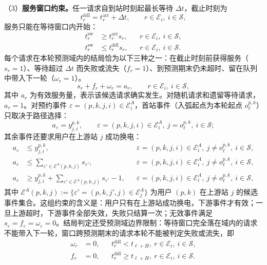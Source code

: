 \documentclass[12pt,a4paper,UTF8]{ctexart}
\begin{document}
（3）\textbf{服务窗口约束。}任一请求自到站时刻起最长等待 $\Delta t$，截止时刻为
\begin{equation}
t_r^{\mathrm{ddl}}
=
t_r^{\mathrm{arr}}+\Delta t,
\qquad
r\in\mathcal E_i,\ i\in\mathcal S,
\label{eq:waiting_deadline}
\end{equation}
服务只能在等待窗口内开始：
\begin{subequations}
\label{eq:service_window}
\begin{align}
t_r^{\mathrm{sw}}&\ge t_r^{\mathrm{arr}}s_r,
&&r\in\mathcal E_i,\ i\in\mathcal S,\\
t_r^{\mathrm{sw}}&\le t_r^{\mathrm{ddl}}s_r,
&&r\in\mathcal E_i,\ i\in\mathcal S.
\end{align}
\end{subequations}
每个请求在本轮预测域内的结局恰为以下三种之一：在截止时刻前获得服务（$s_r=1$）、等待超过 $\Delta t$ 而失败或流失（$f_r=1$）、到预测期末仍未超时、留在队列中带入下一轮（$\omega_r=1$）。
\begin{equation}
s_r+f_r+\omega_r=a_r,
\qquad
r\in\mathcal E_i,\ i\in\mathcal S,
\label{eq:reservation_conservation_main}
\end{equation}
其中 $a_r$ 为有效服务量，表示该候选请求确实发生。对随机请求和遗留等待请求，$a_r=1$。对预约事件 $\varepsilon=(p,k,j,i)\in\mathcal E_i^A$，首站事件（入弧起点为本轮起点 $o_\ell^{p,k}$）只取决于路径选择：
\begin{equation}
a_\varepsilon=y_{j,i}^{p,k},
\qquad
\varepsilon=(p,k,j,i)\in\mathcal E_i^A,\ j=o_\ell^{p,k},\ i\in\mathcal S;
\label{eq:first_event_activation}
\end{equation}
其余事件还要求用户在上游站 $j$ 成功换电：
\begin{subequations}
\label{eq:reservation_alive_chain}
\begin{align}
a_\varepsilon&\le y_{j,i}^{p,k},
&&\varepsilon=(p,k,j,i)\in\mathcal E_i^A,\ j\ne o_\ell^{p,k},\ i\in\mathcal S,\\
a_\varepsilon&\le
\sum_{\varepsilon'\in\mathcal E^A(p,k,j)}s_{\varepsilon'},
&&\varepsilon=(p,k,j,i)\in\mathcal E_i^A,\ j\ne o_\ell^{p,k},\ i\in\mathcal S,\\
a_\varepsilon&\ge y_{j,i}^{p,k}
+\sum_{\varepsilon'\in\mathcal E^A(p,k,j)}s_{\varepsilon'}-1,
&&\varepsilon=(p,k,j,i)\in\mathcal E_i^A,\ j\ne o_\ell^{p,k},\ i\in\mathcal S,
\end{align}
\end{subequations}
其中 $\mathcal E^A(p,k,j):=\{\varepsilon'=(p,k,j',j)\in\mathcal E_j^A\}$ 为用户 $(p,k)$ 在上游站 $j$ 的候选事件集合。这组约束的含义是：用户只有在上游站成功换电，下游事件才有效；一旦上游超时，下游事件全部失效，失败只结算一次；无效事件满足 $s_\varepsilon=f_\varepsilon=\omega_\varepsilon=0$。结局判定还受预测域边界限制：等待窗口完全落在域内的请求不能带入下一轮，窗口跨预测期末的请求本轮不能被判定失败或流失，即
\begin{subequations}
\label{eq:outcome_boundary}
\begin{align}
\omega_r&=0,
&&t_r^{\mathrm{ddl}}<t_{\ell+H},\ r\in\mathcal E_i,\ i\in\mathcal S,\\
f_r&=0,
&&t_r^{\mathrm{ddl}}\ge t_{\ell+H},\ r\in\mathcal E_i,\ i\in\mathcal S.
\end{align}
\end{subequations}
\end{document}
